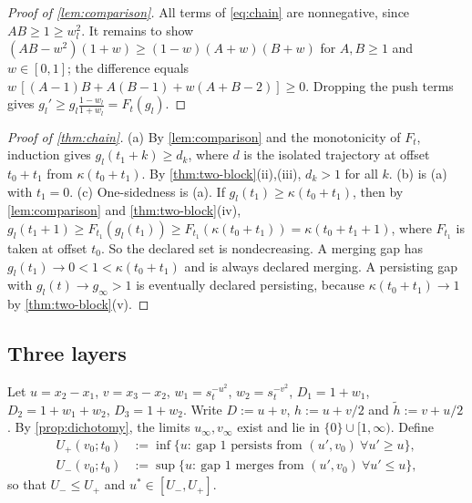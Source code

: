 \begin{proof}[Proof of \cref{lem:comparison}]
All terms of \eqref{eq:chain} are nonnegative, since $AB\ge1\ge w_l^2$. It remains to show $(AB-w^2)(1+w)\ge(1-w)(A+w)(B+w)$ for $A,B\ge1$ and
$w\in[0,1]$; the difference equals $w\,[(A-1)B+A(B-1)+w(A+B-2)]\ge0$. Dropping the push terms gives
$g_l'\ge g_l\frac{1-w_l}{1+w_l}=F_t(g_l)$.
\end{proof}

\begin{proof}[Proof of \cref{thm:chain}]
(a) By \cref{lem:comparison} and the monotonicity of $F_t$, induction gives $g_l(t_1+k)\ge d_k$, where $d$ is the isolated trajectory at offset
$t_0+t_1$ from $\kappa(t_0+t_1)$. By \cref{thm:two-block}(ii),(iii), $d_k>1$ for all $k$.
(b) is (a) with $t_1=0$.
(c) One-sidedness is (a). If $g_l(t_1)\ge\kappa(t_0+t_1)$, then by \cref{lem:comparison} and \cref{thm:two-block}(iv),
$g_l(t_1+1)\ge F_{t_1}(g_l(t_1))\ge F_{t_1}(\kappa(t_0+t_1))=\kappa(t_0+t_1+1)$, where $F_{t_1}$ is taken at offset $t_0$. So the declared set
is nondecreasing. A merging gap has $g_l(t_1)\to0<1<\kappa(t_0+t_1)$ and is always declared merging. A persisting gap with $g_l(t)\to g_\infty>1$
is eventually declared persisting, because $\kappa(t_0+t_1)\to1$ by \cref{thm:two-block}(v).
\end{proof}

\subsection{Three layers}\label{app:three}

Let $u=x_2-x_1$, $v=x_3-x_2$, $w_1=s_t^{-u^2}$, $w_2=s_t^{-v^2}$, $D_1=1+w_1$, $D_2=1+w_1+w_2$, $D_3=1+w_2$. Write $D:=u+v$,
$h:=u+v/2$ and $\tilde h:=v+u/2$. By \cref{prop:dichotomy}, the limits $u_\infty,v_\infty$ exist and lie in $\{0\}\cup[1,\infty)$. Define
\begin{align*}
U_+(v_0;t_0)&:=\inf\{u:\ \text{gap 1 persists from }(u',v_0)\ \forall u'\ge u\},\\
U_-(v_0;t_0)&:=\sup\{u:\ \text{gap 1 merges from }(u',v_0)\ \forall u'\le u\},
\end{align*}
so that $U_-\le U_+$ and $u^*\in[U_-,U_+]$.

